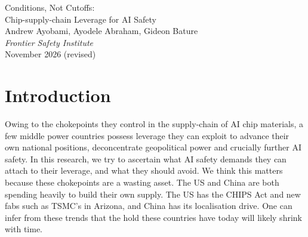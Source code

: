 \documentclass[11pt]{article}
\begin{document}
\begin{center}
{\Large Conditions, Not Cutoffs:\\[0.3em]
Chip-supply-chain Leverage for AI Safety}\\[1.6em]
Andrew Ayobami, Ayodele Abraham, Gideon Bature\\[0.4em]
\textit{Frontier Safety Institute}\\[1.1em]
November 2026 (revised)
\end{center}
\vspace{0.5em}

\begin{abstract}
A handful of countries outside the US and China hold parts of the AI chip supply chain that nobody can yet do without. Which AI-safety requests could they credibly attach to that position? We screened supply chain data for countries whose firms hold 40\% or more of world supply of a chip input, which gave eight countries and 35 chokepoints, and compared these with nine past cases of supplier leverage. Both cases where leverage was used as a condition on continued supply worked, while cuts held at best partly, and only where the target needed more than five years to replace the supply. By our scoring, the US could replace 27 of the 35 chokepoints within about five years, and nearly every holder relies on the US for its security, so threats from this group would likely backfire. Used as conditions, however, the strongest chokepoints, held by the Netherlands, Japan and Taiwan, closely resemble the nuclear safeguards regime, a condition on supply that has held since the 1970s. We therefore propose a specific bargain: these countries offer the US shared anti-diversion checks on the tools, fab capacity and memory they control, and ask in return for pre-deployment access to frontier models for their own AI safety evaluators and a role in US-led hardware verification. They should avoid withholding supply, coordinating prices and threatening to sell to China. The most valuable ask, binding safety conditions on the largest compute buyers, remains out of reach for now, though the nuclear precedent suggests a route towards it.
\end{abstract}

\section{Introduction}

Owing to the chokepoints they control in the supply-chain of AI chip materials, a few middle power countries possess leverage they can exploit to advance their own national positions, deconcentrate geopolitical power and crucially further AI safety. In this research, we try to ascertain what AI safety demands they can attach to their leverage, and what they should avoid. We think this matters because these chokepoints are a wasting asset. The US and China are both spending heavily to build their own supply. The US has the CHIPS Act and new fabs such as TSMC's in Arizona, and China has its localisation drive. One can infer from these trends that the hold these countries have today will likely shrink with time.
\end{document}
